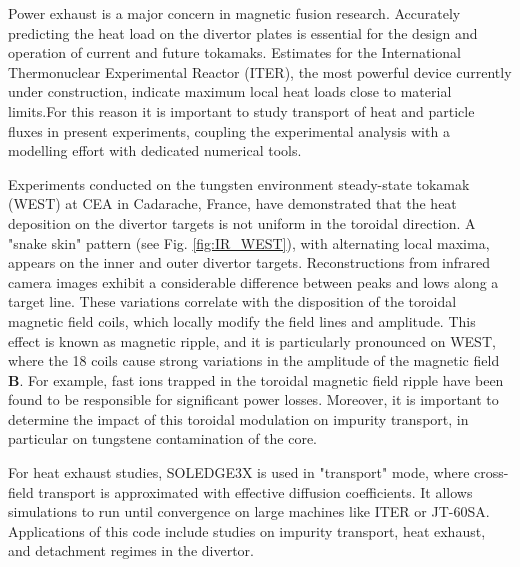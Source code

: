 Power exhaust is a major concern in magnetic fusion research. Accurately predicting the heat load on the divertor plates is essential for the design and operation of current and future tokamaks. Estimates for the International Thermonuclear Experimental Reactor (ITER), the most powerful device currently under construction, indicate maximum local heat loads close to material limits\cite{gunn2017surface}.For this reason it is important to study transport of heat and particle fluxes in present experiments, coupling the experimental analysis with a modelling effort  with dedicated numerical tools. \newline

Experiments conducted on the tungsten environment steady-state tokamak (WEST) at CEA in Cadarache, France\cite{bucalossi2022}, have demonstrated that the heat deposition on the divertor targets is not uniform in the toroidal direction. A "snake skin" pattern (see Fig. \ref{fig:IR_WEST}), with alternating local maxima, appears on the inner and outer divertor targets. Reconstructions from infrared camera images exhibit a considerable difference between peaks and lows along a target line. These variations correlate with the disposition of the toroidal magnetic field coils, which locally modify the field lines and amplitude. This effect is known as magnetic ripple\cite{tani1981effect}, and it is particularly pronounced on WEST, where the 18 coils cause strong variations in the amplitude of the magnetic field $\textbf{B}$. For example, fast ions trapped in the toroidal magnetic field ripple have been found to be responsible for significant power losses\cite{moiraf2023optimization}. Moreover, it is important to determine the impact of this toroidal modulation on impurity transport, in particular on tungstene contamination of the core\cite{diGenova2021modelling}. \newline

For heat exhaust studies, SOLEDGE3X is used in "transport" mode, where cross-field transport is approximated with effective diffusion coefficients. It allows simulations to run until convergence on large machines like ITER\cite{rivals2022soledge3x} or JT-60SA\cite{deGianni2024}. Applications of this code include studies on impurity transport\cite{Ciraolo2021}, heat exhaust\cite{rivals2022impact}, and detachment regimes in the divertor\cite{yang2023control}. \newline


